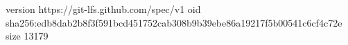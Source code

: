 version https://git-lfs.github.com/spec/v1
oid sha256:edb8dab2b8f3f591bcd451752cab308b9b39ebe86a19217f5b00541c6cf4c72e
size 13179
